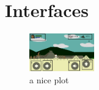 \section{Interfaces}\label{Anexo:Intefaces}

\begin{figure}[h]
    \centering
    \includegraphics[width=0.25\textwidth]{Anexos/Interfaces/ControlCorrerDer.jpg}
    \caption{a nice plot}
    \label{fig:mesh1}
\end{figure}